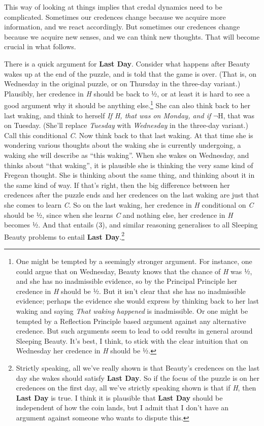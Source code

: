 \documentclass[
  11pt,
  letterpaper,
  DIV=11,
  numbers=noendperiod,
  twoside]{scrartcl}
\begin{document}
This way of looking at things implies that credal dynamics need to be
complicated. Sometimes our credences change because we acquire more
information, and we react accordingly. But sometimes our credences
change because we acquire new senses, and we can think new thoughts.
That will become crucial in what follows.

There is a quick argument for \textbf{Last Day}. Consider what happens
after Beauty wakes up at the end of the puzzle, and is told that the
game is over. (That is, on Wednesday in the original puzzle, or on
Thursday in the three-day variant.) Plausibly, her credence in \emph{H}
should be back to ½, or at least it is hard to see a good argument why
it should be anything else.\footnote{One might be tempted by a seemingly
  stronger argument. For instance, one could argue that on Wednesday,
  Beauty knows that the chance of \emph{H} was ½, and she has no
  inadmissible evidence, so by the Principal Principle her credence in
  \emph{H} should be ½. But it isn't clear that she has no inadmissible
  evidence; perhaps the evidence she would express by thinking back to
  her last waking and saying \emph{That waking happened} is
  inadmissible. Or one might be tempted by a Reflection Principle based
  argument against any alternative credence. But such arguments seem to
  lead to odd results in general around Sleeping Beauty. It's best, I
  think, to stick with the clear intuition that on Wednesday her
  credence in \emph{H} should be ½.} She can also think back to her last
waking, and think to herself \emph{If H, that was on Monday, and if}
\(¬\)H, that was on Tuesday. (She'll replace \emph{Tuesday} with
\emph{Wednesday} in the three-day variant.) Call this conditional
\emph{C}. Now think back to that last waking. At that time she is
wondering various thoughts about the waking she is currently undergoing,
a waking she will describe as ``this waking''. When she wakes on
Wednesday, and thinks about ``that waking'', it is plausible she is
thinking the very same kind of Fregean thought. She is thinking about
the same thing, and thinking about it in the same kind of way. If that's
right, then the big difference between her credences after the puzzle
ends and her credences on the last waking are just that she comes to
learn \emph{C}. So on the last waking, her credence in \emph{H}
conditional on \emph{C} should be ½, since when she learns \emph{C} and
nothing else, her credence in \emph{H} becomes ½. And that entails (3),
and similar reasoning generalises to all Sleeping Beauty problems to
entail \textbf{Last Day}.\footnote{Strictly speaking, all we've really
  shown is that Beauty's credences on the last day she wakes should
  satisfy \textbf{Last Day}. So if the focus of the puzzle is on her
  credences on the first day, all we've strictly speaking shown is that
  if \emph{H}, then \textbf{Last Day} is true. I think it is plausible
  that \textbf{Last Day} should be independent of how the coin lands,
  but I admit that I don't have an argument against someone who wants to
  dispute this.}
\end{document}
